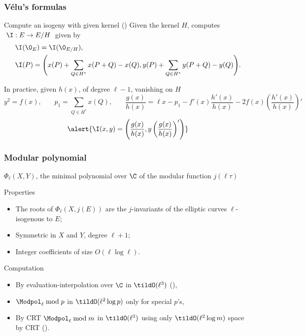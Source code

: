 \documentclass[10pt]{beamer}
\begin{document}
\begin{frame}
  \frametitle{Vélu's formulas}
  
  \begin{block}{Compute an isogeny with given kernel (\cite{velu71})}
    Given the kernel $H$, computes $\;\I : E\to E/H\;$ given by
    \begin{align*}
      &\I(\0_E) = \I(\0_{E/H})\text{,}\\
      &\begin{aligned}
        \I(P) = \Biggl(x(P) + \sum_{Q\in H^\ast}x(P+Q) - x(Q),
        y(P) + \sum_{Q\in H^\ast}y(P+Q) - y(Q) \Biggr) \text{.}
      \end{aligned}
    \end{align*}
  \end{block}

  \begin{block}{In practice, given $h(x)$, of degree $\ell-1$,
      vanishing on $H$}
    {\footnotesize
      \[
      y^2 = f(x)\text{,}
      \qquad
      p_1 = \sum_{Q\in H^\ast} x(Q)\text{,}
      \qquad
      \frac{g(x)}{h(x)} = \ell x - p_1 - f'(x)\frac{h'(x)}{h(x)} - 2f(x)\left(\frac{h'(x)}{h(x)}\right)'\]}
    \[\alert{\I(x,y) = \left(\frac{g(x)}{h(x)}, y\left(\frac{g(x)}{h(x)}\right)'\right)}\]
  \end{block}
\end{frame}



\begin{frame}
  \frametitle{Modular polynomial}

  \begin{center}
    $\Phi_\ell(X,Y)$, the minimal polynomial over $\C$ of the modular
    function $j(\ell\tau)$
  \end{center}

  \begin{block}{Properties}
    \begin{itemize}
    \item The roots of $\Phi_\ell(X,j(E))$ are the $j$-invariants
      of the elliptic curves $\ell$-isogenous to $E$;
    \item Symmetric in $X$ and $Y$, degree $\ell+1$;
    \item Integer coefficients of size $O(\ell\log\ell)$.
    \end{itemize}
  \end{block}

  \begin{block}{Computation}
    \begin{itemize}
    \item By evaluation-interpolation over $\C$ in $\tildO(\ell^3)$  (\cite{enge09}),
    \item $\Modpol_\ell\bmod p$ in $\tildO(\ell^2\log p)$ \alert{only
        for special $p$'s},
    \item By CRT $\Modpol_\ell\bmod m$ in $\tildO(\ell^3)$ using only
      $\tildO(\ell^2\log m)$ space by CRT (\cite{sutherland10:modpol}).
    \end{itemize}
  \end{block}
\end{frame}
\end{document}
